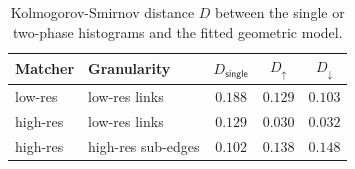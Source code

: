 \documentclass[sigconf, review]{acmart}
\begin{document}
\begin{table}[H]
\centering
\caption{Kolmogorov-Smirnov distance $D$ between the single or two-phase
histograms and the fitted geometric model.}  %
\label{tab:geom-fit}
{
\setlength{\tabcolsep}{4pt}
\renewcommand{\arraystretch}{1.20}
\begin{tabular}{@{}llccc@{}}
\toprule
Matcher & Granularity 
  & $D_{\textsf{single}}$
  & $D_{\uparrow}$
  & $D_{\downarrow}$ \\
\midrule
low-res  & low-res links      & $0.188$ & $0.129$ & $0.103$ \\
\rowcolor{gray!15} 
high-res & low-res links       & $0.129$ & $\mathbf{0.030}$ & $\mathbf{0.032}$ \\
high-res & high-res sub-edges &  $0.102$ & $0.138$ & $0.148$ \\
\bottomrule
\end{tabular}
}
\end{table}




\end{document}
